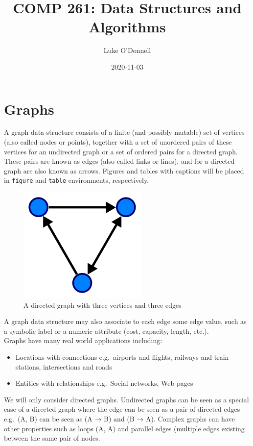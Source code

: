 \documentclass[
]{book}
\title{COMP 261: Data Structures and Algorithms}
\author{Luke O'Donnell}
\date{2020-11-03}
\providecommand{\tightlist}{%
  \setlength{\itemsep}{0pt}\setlength{\parskip}{0pt}}
\begin{document}
\maketitle

{
\setcounter{tocdepth}{1}
\tableofcontents
}
\hypertarget{graphs}{%
\chapter{Graphs}\label{graphs}}

A graph data structure consists of a finite (and possibly mutable) set of vertices (also called nodes or points), together with a set of unordered pairs of these vertices for an undirected graph or a set of ordered pairs for a directed graph. These pairs are known as edges (also called links or lines), and for a directed graph are also known as arrows.
Figures and tables with captions will be placed in \texttt{figure} and \texttt{table} environments, respectively.

\begin{figure}

{\centering \includegraphics[width=0.3\linewidth,height=0.3\textheight]{img/01-image01} 

}

\caption{A directed graph with three vertices and three edges}\label{fig:graph}
\end{figure}

A graph data structure may also associate to each edge some edge value, such as a symbolic label or a numeric attribute (cost, capacity, length, etc.).\\
Graphs have many real world applications including:

\begin{itemize}
\tightlist
\item
  Locations with connections e.g.~airports and flights, railways and train stations, intersections and roads
\item
  Entities with relationships e.g.~Social networks, Web pages
\end{itemize}

We will only consider directed graphs. Undirected graphs can be seen as a special case of a directed graph where the edge can be seen as a pair of directed edges e.g.~(A, B) can be seen as (A → B) and (B → A). Complex graphs can have other properties such as loops (A, A) and parallel edges (multiple edges existing between the same pair of nodes.
\end{document}
